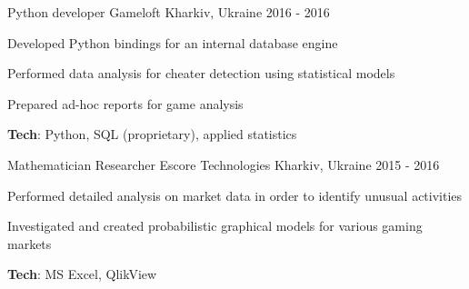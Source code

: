 \begin{cventries}
  \cventry
    {Python developer} %
    {Gameloft} %
    {Kharkiv, Ukraine} %
    {2016 - 2016} %
    {
      \begin{cvitems} %
        \item {Developed Python bindings for an internal database engine}
        \item {Performed data analysis for cheater detection using statistical models}
        \item {Prepared ad-hoc reports for game analysis}
        \item {{\color{awesome-skyblue} \bf Tech}: Python, SQL (proprietary), applied statistics}
      \end{cvitems}
    }

  \cventry
    {Mathematician Researcher} %
    {Escore Technologies} %
    {Kharkiv, Ukraine} %
    {2015 - 2016} %
    {
      \begin{cvitems} %
        \item {Performed detailed analysis on market data in order to identify unusual activities}
        \item {Investigated and created probabilistic graphical models for various gaming markets}
        \item {{\color{awesome-skyblue} \bf Tech}: MS Excel, QlikView}
      \end{cvitems}
    }

\end{cventries}
